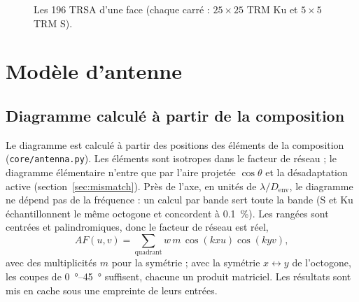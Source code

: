 \documentclass[11pt,a4paper]{article}
\newcommand{\code}[1]{\texttt{\small #1}}
\newcommand{\Denv}{D_{\mathrm{env}}}
\begin{document}
\begin{figure}[ht]
\centering
{}
\caption{Les 196 TRSA d'une face (chaque carré : $25\times25$ TRM Ku et $5\times5$ TRM S).}
\label{fig:octagon}
\end{figure}

\section{Modèle d'antenne}

\subsection{Diagramme calculé à partir de la composition}
Le diagramme est calculé à partir des positions des éléments de la composition (\code{core/antenna.py}). Les éléments
sont isotropes dans le facteur de réseau ; le diagramme élémentaire n'entre que par l'aire projetée $\cos\theta$ et la
désadaptation active (section~\ref{sec:mismatch}). Près de l'axe, en unités de $\lambda/\Denv$, le diagramme ne dépend
pas de la fréquence : un calcul par bande sert toute la bande (S et Ku échantillonnent le même octogone et concordent à
\SI{0.1}{\percent}). Les rangées sont centrées et palindromiques, donc le facteur de réseau est réel,
\[
  AF(u,v) = \sum_{\text{quadrant}} w\,m\,\cos(k x u)\cos(k y v),
\]
avec des multiplicités $m$ pour la symétrie ; avec la symétrie $x\leftrightarrow y$ de l'octogone, les coupes de
\SIrange{0}{45}{\degree} suffisent, chacune un produit matriciel. Les résultats sont mis en cache sous une empreinte de
leurs entrées.
\end{document}
